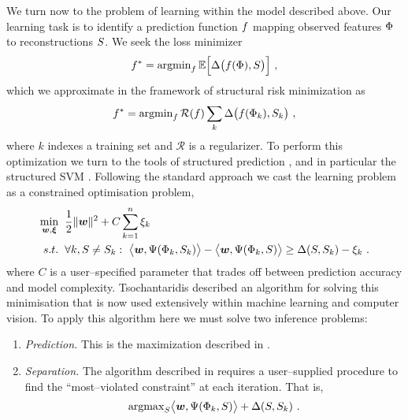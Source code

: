 We turn now to the problem of learning within the model described
above. Our learning task is to identify a prediction function
$\Predictor$ mapping observed features $\Features$ to reconstructions
$\Seam$. We seek the loss minimizer
\begin{equation}
  \OptPredictor = 
  \argmin_{\Predictor} 
  \Expected \Bigl[ 
    \Loss\bigl(\Predictor(\Features),\Seam\bigr)
    \Bigr] ~,
\end{equation}
which we approximate in the framework of structural risk minimization as
\begin{equation}
  \OptPredictor = 
  \argmin_{\Predictor} 
    \mathcal{R}(\Predictor) \sum_k
      \Loss\bigl(\Predictor(\Features_k),\Seam_k\bigr) ~,
\end{equation}
where $k$ indexes a training set and $\mathcal{R}$ is a
regularizer. To perform this optimization we turn to the tools of
structured prediction \cite{Bakir07}, and in particular the structured
SVM \cite{Tsochantaridis04}. Following the standard approach
\cite{Bakir07} we cast the learning problem as a constrained
optimisation problem,
\begin{equation}
  \begin{split}
    \min_{\Model,\Slacks} &
      \hspace{2mm} 
    \frac{1}{2} \|\Model\|^2 +
      C \sum_{k=1}^n \Slack_k\\
    s.t. & \hspace{2mm} \forall k, \Seam \neq \Seam_k:~
      \bigl\langle\Model, \JointFtr(\Features_k,\Seam_k)\bigr\rangle -
      \bigl\langle\Model, \JointFtr(\Features_k,\Seam)\bigr\rangle
      \geq
      \Loss(\Seam,\Seam_k) - \Slack_k ~.
  \end{split}
  \label{eq:svm-problem}
\end{equation}
where $C$ is a user--specified parameter that trades off between
prediction accuracy and model complexity. Tsochantaridis \etal
\cite{Tsochantaridis04} described an algorithm for solving this
minimisation that is now used extensively within machine learning and
computer vision. To apply this algorithm here we must solve two
inference problems:
\begin{enumerate}
  \item{\textit{Prediction.} This is the maximization described in
    .}
  \item{\textit{Separation.} The algorithm described in
    \cite{Tsochantaridis04} requires a user--supplied procedure to
    find the ``most--violated constraint'' at each iteration. That is,
    \begin{equation}
      \argmax_{\Seam}
        \bigl\langle\Model, \JointFtr(\Features_k,\Seam)\bigr\rangle
        + \Loss(\Seam,\Seam_k) ~.
        \label{eq:separation-problem}
    \end{equation}
  }
\end{enumerate}

